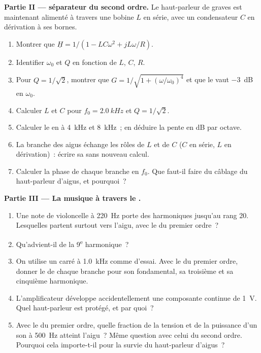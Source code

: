 \begin{problem}
\medskip
\noindent\textbf{Partie II ---  séparateur du second ordre.}
Le haut-parleur de graves est maintenant alimenté à travers une bobine
$L$ en série, avec un condensateur $C$ en dérivation à ses bornes.
\begin{enumerate}[resume]
  \item Montrer que $\underline H = 1/(1 - LC\omega^2 + jL\omega/R)$.
  \item Identifier $\omega_0$ et $Q$ en fonction de $L$, $C$, $R$.
  \item Pour $Q = 1/\sqrt2$, montrer que $G = 1/\sqrt{1 + (\omega/\omega_0)^4}$
        et que le  vaut \qty{-3}{dB} en $\omega_0$.
  \item Calculer $L$ et $C$ pour $f_0 = \qty{2.0}{kHz}$ et $Q = 1/\sqrt2$.
  \item Calculer le  en  à \qty{4}{kHz} et \qty{8}{kHz}~; en
        déduire la pente en dB par octave.
  \item La branche des aigus échange les rôles de $L$ et de $C$ ($C$ en
        série, $L$ en dérivation)~: écrire sa  sans
        nouveau calcul.
  \item Calculer la phase de chaque branche en $f_0$. Que faut-il faire
        du câblage du haut-parleur d'aigus, et pourquoi~?
\end{enumerate}

\medskip
\noindent\textbf{Partie III --- La musique à travers le .}
\begin{enumerate}[resume]
  \item Une note de violoncelle à \qty{220}{Hz} porte des harmoniques
        jusqu'au rang 20. Lesquelles partent surtout vers l'aigu, avec
        le  du premier ordre~?
  \item Qu'advient-il de la 9\textsuperscript{e} harmonique~?
  \item On utilise un  carré à \qty{1.0}{kHz} comme 
        d'essai. Avec le  du premier ordre, donner le  de
        chaque branche pour son fondamental, sa troisième et sa
        cinquième harmonique.
  \item L'amplificateur développe accidentellement une composante
        continue de \qty{1}{V}. Quel haut-parleur est protégé, et par
        quoi~?
  \item Avec le  du premier ordre, quelle fraction de la tension
        et de la puissance d'un son à \qty{500}{Hz} atteint l'aigu~?
        Même question avec celui du second ordre. Pourquoi cela
        importe-t-il pour la survie du haut-parleur d'aigus~?
\end{enumerate}


\end{problem}
